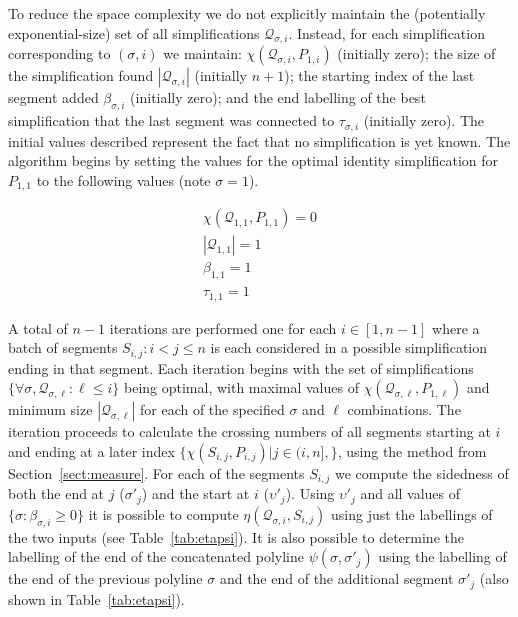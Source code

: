 \documentclass{article}
\begin{document}
To reduce the space complexity we do not explicitly maintain the
(potentially exponential-size) set of
all simplifications $\mathcal{Q}_{\sigma,i}$.  Instead, for each
simplification corresponding to $(\sigma,i)$ we maintain:
$\chi(\mathcal{Q}_{\sigma,i},P_{1,i})$ (initially zero); the size of the
simplification found $|\mathcal{Q}_{\sigma,i}|$ (initially $n+1$); the
starting index of the last segment added $\beta_{\sigma,i}$ (initially
zero); and the end labelling of the best simplification that the last
segment was connected to $\tau_{\sigma,i}$ (initially zero).  The
initial values described represent the fact that no simplification is yet
known.  The algorithm begins by setting the values for the optimal identity
simplification for $P_{1,1}$ to the following values (note $\sigma=1$).

\begin{eqnarray*}
\chi(\mathcal{Q}_{1,1},P_{1,1}) = 0 \\
|\mathcal{Q}_{1,1}| = 1 \\
\beta_{1,1} = 1\\
\tau_{1,1} = 1
\end{eqnarray*} 

A total of $n-1$ iterations are performed one for each $i\in[1,n-1]$ where a 
batch of segments $S_{i,j} : i<j\leq n$ is each considered in a possible 
simplification ending in that segment.  Each iteration begins with the 
set of simplifications $\{\forall \sigma, \mathcal{Q}_{\sigma,\ell} : \ell \leq i\}$ being optimal,
with maximal values of $\chi(\mathcal{Q}_{\sigma,\ell},P_{1,\ell})$ and
minimum size $|\mathcal{Q}_{\sigma,\ell}|$ for each of the specified
$\sigma$ and $\ell$ combinations.  The iteration proceeds to calculate the
crossing numbers of all segments starting at $i$ and ending at a later
index $\{\chi(S_{i,j},P_{i,j}) | j\in (i,n], \}$, using the
method from Section~\ref{sect:measure}.  For each of the segments $S_{i,j}$
we compute the sidedness of both the end at $j$ ($\sigma'_j$) and the start at
$i$ ($\upsilon'_j$).  Using $\upsilon'_j$ and all values of $\{\sigma :
\beta_{\sigma,i} \geq 0\}$ it is possible to compute
$\eta(\mathcal{Q}_{\sigma,i},S_{i,j})$ using just the labellings of the two
inputs (see Table~\ref{tab:etapsi}).  It is also possible to determine
the labelling of the end of the concatenated polyline
$\psi(\sigma,\sigma'_j)$ using the labelling of the end of the previous
polyline $\sigma$ and the end of the additional segment $\sigma'_j$ (also
shown in Table~\ref{tab:etapsi}).
 
\end{document}
